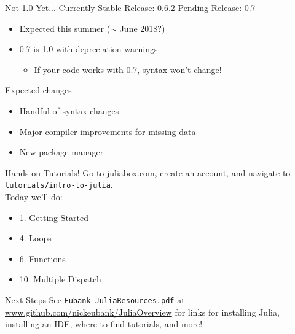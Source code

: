 \documentclass[11pt]{beamer}
\begin{document}
\begin{frame}[c]{Not 1.0 Yet...}
Currently Stable Release: 0.6.2
Pending Release: 0.7
\begin{itemize}
    \item Expected this summer ($\sim$ June 2018?)
    \item 0.7 is 1.0 with depreciation warnings
    \begin{itemize}
        \item If your code works with 0.7, syntax won't change!
    \end{itemize}
\end{itemize}
\end{frame}

\begin{frame}[c]{Expected changes}
\begin{itemize}
    \item Handful of syntax changes
    \item Major compiler improvements for missing data
    \item New package manager
\end{itemize}
\end{frame}

\begin{frame}[c]{Hands-on Tutorials!}
    Go to \url{juliabox.com}, create an account, and navigate to \texttt{tutorials/intro-to-julia}.\\
    Today we'll do:
    \begin{itemize}
        \item 1. Getting Started
        \item 4. Loops
        \item 6. Functions
        \item 10. Multiple Dispatch
    \end{itemize}
\end{frame}


\begin{frame}[c]{Next Steps}
 See \texttt{Eubank\_JuliaResources.pdf} at \url{www.github.com/nickeubank/JuliaOverview} for links for installing Julia, installing an IDE, where to find tutorials, and more!
\end{frame}
\end{document}
